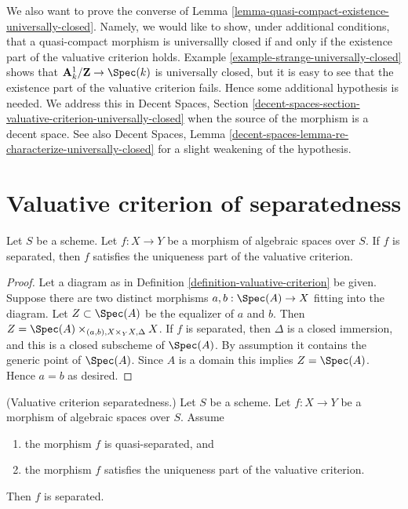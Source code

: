 \noindent
We also want to prove the converse of
Lemma \ref{lemma-quasi-compact-existence-universally-closed}.
Namely, we would like to show, under additional conditions, that
a quasi-compact morphism is universallly closed if and only if
the existence part of the valuative criterion holds.
Example \ref{example-strange-universally-closed}
shows that $\mathbf{A}^1_k/\mathbf{Z} \to \Spec(k)$ is universally
closed, but it is easy to see that the existence part of
the valuative criterion fails. Hence some
additional hypothesis is needed. We address this in
Decent Spaces, Section
\ref{decent-spaces-section-valuative-criterion-universally-closed}
when the source of the morphism is a decent space.
See also
Decent Spaces,
Lemma \ref{decent-spaces-lemma-re-characterize-universally-closed}
for a slight weakening of the hypothesis.














\section{Valuative criterion of separatedness}
\label{section-valuative-separatedness}

\begin{lemma}
\label{lemma-separated-implies-valuative}
Let $S$ be a scheme.
Let $f : X \to Y$ be a morphism of algebraic spaces over $S$.
If $f$ is separated, then $f$ satisfies the uniqueness
part of the valuative criterion.
\end{lemma}

\begin{proof}
Let a diagram as in Definition \ref{definition-valuative-criterion}
be given. Suppose there are two distinct morphisms
$a, b : \Spec(A) \to X$ fitting into the diagram.
Let $Z \subset \Spec(A)$ be the equalizer of $a$ and $b$.
Then $Z = \Spec(A) \times_{(a, b), X \times_Y X, \Delta} X$.
If $f$ is separated, then $\Delta$ is a closed immersion, and
this is a closed subscheme of $\Spec(A)$. By assumption it contains
the generic point of $\Spec(A)$. Since $A$ is a domain
this implies $Z = \Spec(A)$. Hence $a = b$ as desired.
\end{proof}

\begin{lemma}
\label{lemma-valuative-criterion-separatedness}
(Valuative criterion separatedness.)
Let $S$ be a scheme.
Let $f : X \to Y$ be a morphism of algebraic spaces over $S$.
Assume
\begin{enumerate}
\item the morphism $f$ is quasi-separated, and
\item the morphism $f$ satisfies the uniqueness
part of the valuative criterion.
\end{enumerate}
Then $f$ is separated.
\end{lemma}

